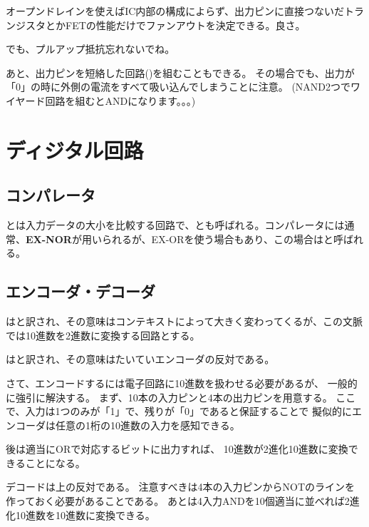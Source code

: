 \documentclass[12pt]{ltjsarticle}
\begin{document}
オープンドレインを使えばIC内部の構成によらず、出力ピンに直接つないだトランジスタとかFETの性能だけでファンアウトを決定できる。良さ。

でも、プルアップ抵抗忘れないでね。

あと、出力ピンを短絡した回路()を組むこともできる。
その場合でも、出力が「0」の時に外側の電流をすべて吸い込んでしまうことに注意。
(NAND2つでワイヤード回路を組むとANDになります。。。)


\section{ディジタル回路}
\subsection{コンパレータ}
とは入力データの大小を比較する回路で、とも呼ばれる。コンパレータには通常、{\bf EX-NOR}が用いられるが、EX-ORを使う場合もあり、この場合はと呼ばれる。

\subsection{エンコーダ・デコーダ}
はと訳され、その意味はコンテキストによって大きく変わってくるが、この文脈では10進数を2進数に変換する回路とする。

はと訳され、その意味はたいていエンコーダの反対である。

さて、エンコードするには電子回路に10進数を扱わせる必要があるが、
一般的に強引に解決する。
まず、10本の入力ピンと4本の出力ピンを用意する。
ここで、入力は1つのみが「1」で、残りが「0」であると保証することで
擬似的にエンコーダは任意の1桁の10進数の入力を感知できる。

後は適当にORで対応するビットに出力すれば、
10進数が2進化10進数に変換できることになる。

デコードは上の反対である。
注意すべきは4本の入力ピンからNOTのラインを作っておく必要があることである。
あとは4入力ANDを10個適当に並べれば2進化10進数を10進数に変換できる。
\end{document}
